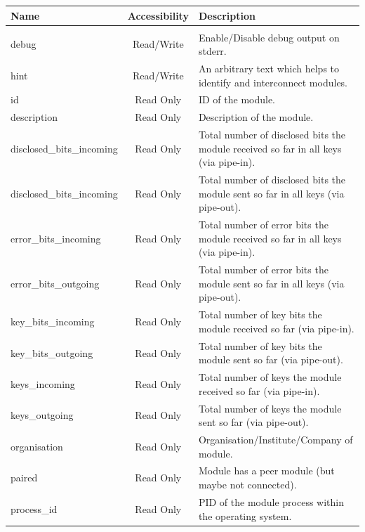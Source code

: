\begin{table}[h!]
    \begin{tabular}{lcp{8cm}}
    Name                        &   Accessibility       &   Description \\
    \hline
    \\
    debug                       &   Read/Write          &   Enable/Disable debug output on stderr.\\
    hint                        &   Read/Write          &   An arbitrary text which helps to identify and interconnect modules.\\
    id                          &   Read Only           &   ID of the module.\\
    description                 &   Read Only           &   Description of the module.\\
    disclosed\_bits\_incoming   &   Read Only           &   Total number of disclosed bits the module received so far in all keys (via pipe-in).\\
    disclosed\_bits\_incoming   &   Read Only           &   Total number of disclosed bits the module sent so far in all keys (via pipe-out).\\
    error\_bits\_incoming       &   Read Only           &   Total number of error bits the module received so far in all keys (via pipe-in).\\
    error\_bits\_outgoing       &   Read Only           &   Total number of error bits the module sent so far in all keys (via pipe-out).\\
    key\_bits\_incoming         &   Read Only           &   Total number of key bits the module received so far (via pipe-in).\\
    key\_bits\_outgoing         &   Read Only           &   Total number of key bits the module sent so far (via pipe-out).\\
    keys\_incoming              &   Read Only           &   Total number of keys the module received so far (via pipe-in).\\
    keys\_outgoing              &   Read Only           &   Total number of keys the module sent so far (via pipe-out).\\
    organisation                &   Read Only           &   Organisation/Institute/Company of module.\\
    paired                      &   Read Only           &   Module has a peer module (but maybe not connected).\\
    process\_id                 &   Read Only           &   PID of the module process within the operating system.\\

\end{tabular}
\end{table}
